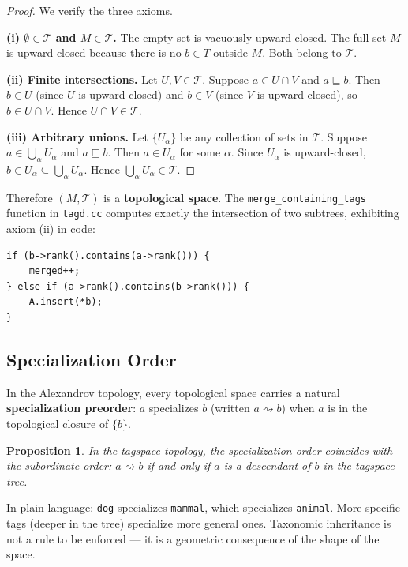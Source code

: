 \documentclass{article}
\newtheorem{proposition}{Proposition}[section]
\begin{document}
\begin{proof}
We verify the three axioms.

\textbf{(i) $\emptyset \in \mathcal{T}$ and $M \in \mathcal{T}$.}
The empty set is vacuously upward-closed. The full set $M$ is upward-closed
because there is no $b \in T$ outside $M$. Both belong to $\mathcal{T}$.

\textbf{(ii) Finite intersections.}
Let $U, V \in \mathcal{T}$. Suppose $a \in U \cap V$ and $a \sqsubseteq b$.
Then $b \in U$ (since $U$ is upward-closed) and $b \in V$ (since $V$ is
upward-closed), so $b \in U \cap V$. Hence $U \cap V \in \mathcal{T}$.

\textbf{(iii) Arbitrary unions.}
Let $\{U_\alpha\}$ be any collection of sets in $\mathcal{T}$. Suppose
$a \in \bigcup_\alpha U_\alpha$ and $a \sqsubseteq b$. Then $a \in U_\alpha$
for some $\alpha$. Since $U_\alpha$ is upward-closed, $b \in U_\alpha
\subseteq \bigcup_\alpha U_\alpha$. Hence $\bigcup_\alpha U_\alpha \in
\mathcal{T}$.
\end{proof}

Therefore $(M, \mathcal{T})$ is a \textbf{topological space}. The
\texttt{merge\_containing\_tags} function in \texttt{tagd.cc} computes
exactly the intersection of two subtrees, exhibiting axiom (ii) in code:
\begin{lstlisting}[style=cpp, caption={Intersection of subtrees in tagd.cc}]
if (b->rank().contains(a->rank())) {
    merged++;
} else if (a->rank().contains(b->rank())) {
    A.insert(*b);
}
\end{lstlisting}

\subsection{Specialization Order}

In the Alexandrov topology, every topological space carries a natural
\textbf{specialization preorder}: $a$ specializes $b$ (written
$a \rightsquigarrow b$) when $a$ is in the topological closure of $\{b\}$.

\begin{proposition}
In the tagspace topology, the specialization order coincides with the
subordinate order: $a \rightsquigarrow b$ if and only if $a$ is a descendant
of $b$ in the tagspace tree.
\end{proposition}

In plain language: \texttt{dog} specializes \texttt{mammal}, which specializes
\texttt{animal}. More specific tags (deeper in the tree) specialize more general
ones. Taxonomic inheritance is not a rule to be enforced --- it is a geometric
consequence of the shape of the space.
\end{document}
